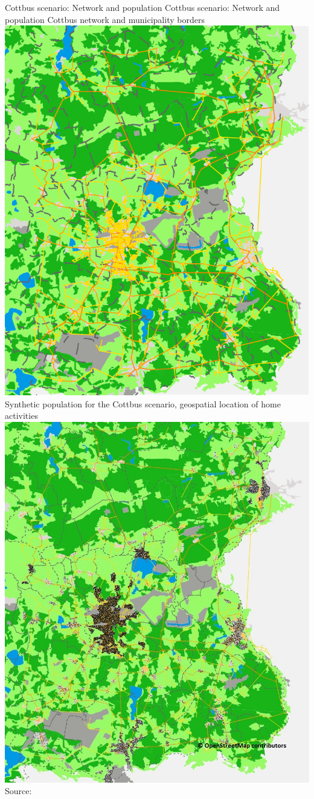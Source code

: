 \createfigure%
{Cottbus scenario: Network and population}%
{Cottbus scenario: Network and population}%
{\label{fig:cottbus_network_population}}%
{%
  \createsubfigure%
	{Cottbus network and municipality borders}
	{\includegraphics[width=0.49\linewidth]{./scenarios/figures/2013_network_gemeinden_landuse_edit.pdf}}
	{\label{fig:network_municipalities_cottbus_landuse}}
  \createsubfigure%
	{Synthetic population for the Cottbus scenario, geospatial location of home activities}
	{\includegraphics[width=0.49\linewidth]{./scenarios/figures/2013_network_gemeinden_landuse_population_home.jpg}}
	{\label{fig:cottbus_population_home}}
}%
{Source:~\citet{Grether_PhDThesis_2014}} 

